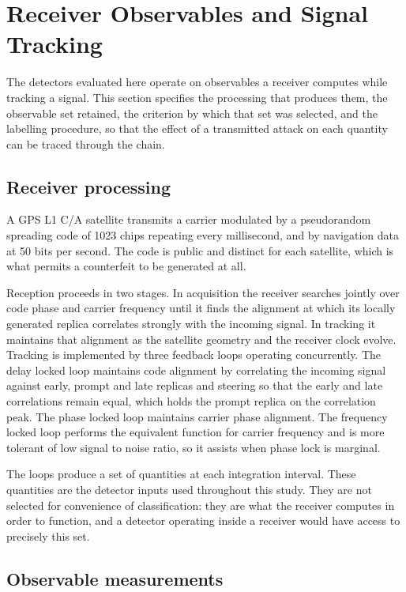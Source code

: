 \documentclass[pdflatex,sn-basic]{sn-jnl}
\theoremstyle{thmstyleone}
\theoremstyle{thmstyletwo}
\theoremstyle{thmstylethree}
\begin{document}
\section{Receiver Observables and Signal Tracking}
\label{sec:signal}

The detectors evaluated here operate on observables a receiver computes while tracking a
signal. This section specifies the processing that produces them, the observable set
retained, the criterion by which that set was selected, and the labelling procedure, so
that the effect of a transmitted attack on each quantity can be traced through the chain.

\subsection{Receiver processing}

A GPS L1 C/A satellite transmits a carrier modulated by a pseudorandom spreading code of
1023 chips repeating every millisecond, and by navigation data at 50 bits per second. The
code is public and distinct for each satellite, which is what permits a counterfeit to be
generated at all.

Reception proceeds in two stages. In acquisition the receiver searches jointly over code
phase and carrier frequency until it finds the alignment at which its locally generated
replica correlates strongly with the incoming signal. In tracking it maintains that
alignment as the satellite geometry and the receiver clock evolve. Tracking is implemented
by three feedback loops operating concurrently. The delay locked loop maintains code
alignment by correlating the incoming signal against early, prompt and late replicas and
steering so that the early and late correlations remain equal, which holds the prompt
replica on the correlation peak. The phase locked loop maintains carrier phase alignment.
The frequency locked loop performs the equivalent function for carrier frequency and is
more tolerant of low signal to noise ratio, so it assists when phase lock is marginal.

The loops produce a set of quantities at each integration interval. These quantities are
the detector inputs used throughout this study. They are not selected for convenience of
classification: they are what the receiver computes in order to function, and a detector
operating inside a receiver would have access to precisely this set.

\subsection{Observable measurements}
\label{sec:features}
\end{document}
